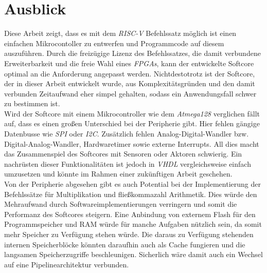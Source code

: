\chapter{Ausblick}

    Diese Arbeit zeigt, dass es mit dem \textit{RISC-V} Befehlssatz möglich
    ist einen einfachen Mikrocontoller zu entwerfen und Programmcode auf diesem
    auszuführen. Durch die freizügige Lizenz des Befehlssatzes, die damit
    verbundene Erweiterbarkeit und die freie Wahl eines \textit{FPGAs}, kann der
    entwickelte Softcore optimal an die Anforderung angepasst werden. 
    Nichtdestotrotz ist der Softcore, der in dieser Arbeit entwickelt wurde,
    aus Komplexitätsgründen und den damit verbunden Zeitaufwand eher simpel
    gehalten, sodass ein Anwendungsfall schwer zu bestimmen ist.
    \\
    Wird der Softcore mit einem Mikrocontroller wie dem \textit{Atmega128}
    verglichen fällt auf, dass es einen großen Unterschied bei der Peripherie gibt.
    Hier fehlen gängige Datenbusse wie \textit{SPI} oder \textit{I2C}.
    Zusätzlich fehlen Analog-Digital-Wandler bzw. Digital-Analog-Wandler, 
    Hardwaretimer sowie externe Interrupts. 
    All dies macht das Zusammenspiel des Softcores mit Sensoren oder Aktoren
    schwierig. Ein nachrüsten dieser Funktionalitäten ist jedoch in \textit{VHDL}
    vergleichsweise einfach umzusetzen und könnte im Rahmen einer zukünftigen Arbeit
    geschehen.
    \\
    Von der Peripherie abgesehen gibt es auch Potential bei der Implementierung
    der Befehlssätze für Multiplikation und fließkommazahl Arithmetik.
    Dies würde den Mehraufwand durch Softwareimplementierungen verringern
    und somit die Performanz des Softcores steigern.
    Eine Anbindung von externem Flash für den Programmspeicher und
    RAM würde für manche Aufgaben nützlich sein, da somit mehr Speicher zu Verfügung
    stehen würde. Die daraus zu Verfügung stehenden internen Speicherblöcke
    könnten daraufhin auch als Cache fungieren und die langsamen Speicherzugriffe beschleunigen.
    Sicherlich wäre damit auch ein Wechsel auf eine Pipelinearchitektur
    verbunden.
    
    

